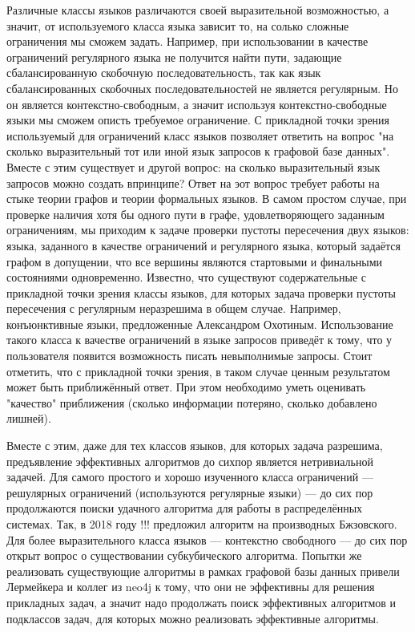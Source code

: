 \documentclass[12pt]{article}  %
\theoremstyle{remark}
\begin{document}
Различные классы языков различаются своей выразительной возможностью, а значит, от используемого класса языка зависит то, на солько сложные ограничения мы сможем задать.
Например, при использовании в качестве ограничений регулярного языка не получится найти пути, задающие сбалансированную скобочную последовательность, так как язык сбалансированных скобочных последовательностей не является регулярным.
Но он является контекстно-свободным, а значит используя контекстно-свободные языки мы сможем описть требуемое ограничение.
С прикладной точки зрения используемый для ограничений класс языков позволяет ответить на вопрос "на сколько выразительный тот или иной язык запросов к графовой базе данных".
Вместе с этим существует и другой вопрос: на сколько выразительный язык запросов можно создать впринципе?
Ответ на эот вопрос требует работы на стыке теории графов и теории формальных языков.
В самом простом случае, при проверке наличия хотя бы одного пути в графе, удовлетворяющего заданным ограничениям, мы приходим к задаче проверки пустоты пересечения двух языков: языка, заданного в качестве ограничений и регулярного языка, который задаётся графом в допущении, что все вершины являются стартовыми и финальными состояниями одновременно.
Известно, что существуют содержательные с прикладной точки зрения классы языков, для которых задача проверки пустоты пересечения с регулярным неразрешима в общем случае.
Например, конъюнктивные языки, предложенные Александром Охотиным.
Использование такого класса к вачестве ограничений в языке запросов приведёт к тому, что у пользователя появится возможность писать невыполнимые запросы.
Стоит отметить, что с прикладной точки зрения, в таком случае ценным результатом может быть приближённый ответ.
При этом необходимо уметь оценивать "качество" приближения (сколько информации потеряно, сколько добавлено лишней).

Вместе с этим, даже для тех классов языков, для которых задача разрешима, предъявление эффективных алгоритмов до сихпор является нетривиальной задачей.
Для самого простого и хорошо изученного класса ограничений --- решулярных ограничений (используются регулярные языки) --- до сих пор продолжаются поиски удачного алгоритма для работы в распределённых системах.
Так, в 2018 году !!! предложил алгоритм на производных Бжзовского.
Для более выразительного класса языков --- контекстно свободного --- до сих пор открыт вопрос о существовании субкубического алгоритма.
Попытки же реализовать существующие алгоритмы в рамках графовой базы данных привели Лермейкера и коллег из neo4j к тому, что они не эффективны для решения прикладных задач, а значит надо продолжать поиск эффективных алгоритмов и подклассов задач, для которых можно реализовать эффективные алгоритмы.
\end{document}
